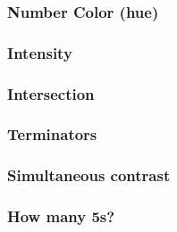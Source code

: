 \documentclass[12pt]{beamer}\usepackage[]{graphicx}\usepackage[]{color}
\begin{document}

\begin{frame}
\frametitle{Number Color (hue)}
\begin{center}
\end{center}
\end{frame}


\begin{frame}
\frametitle{Intensity}
\begin{center}
\end{center}
\end{frame}


\begin{frame}
\frametitle{Intersection}
\begin{center}
\end{center}
\end{frame}


\begin{frame}
\frametitle{Terminators}
\begin{center}
\end{center}
\end{frame}


\begin{frame}
\frametitle{Simultaneous contrast}
\begin{center}
\end{center}
\end{frame}


\begin{frame}
\frametitle{How many 5s?}
\begin{center}
\end{center}
\end{frame}

\end{document}
